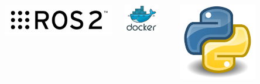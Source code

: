 \documentclass[9pt, aspectratio=169]{beamer}
\begin{document}
\begin{frame}
\begin{columns}
\begin{column}{0.6\textwidth}
\end{column}
\begin{column}{0.1\textwidth}
	\begin{center}
  		\includegraphics[width=1\textwidth]{ROS2}
	\end{center}
\end{column}
\hspace{-0.6cm}
\begin{column}{0.1\textwidth}
	\begin{center}
  		\includegraphics[width=0.8\textwidth]{Docker} 
	\end{center}
\end{column}
\hspace{-0.6cm}
\begin{column}{0.1\textwidth}
	\begin{center}
  		\includegraphics[width=0.7\textwidth]{Python}

\end{center}
\end{column}
\end{columns}
\end{frame}
\end{document}

